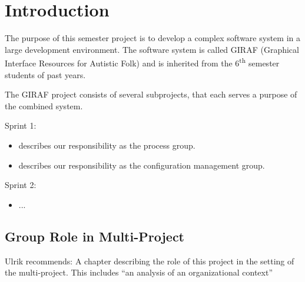 \chapter{Introduction}

The purpose of this semester project is to develop a complex software system in a large development environment. The software system is called GIRAF (Graphical Interface Resources for Autistic Folk) and is inherited from the 6\textsuperscript{th} semester students of past years.

The GIRAF project consists of several subprojects, that each serves a purpose of the combined system.
\\

\begin{documentorganization}
  \item Sprint 1:
  \begin{itemize}
    \item {} describes our responsibility as the process group.
    \item {} describes our responsibility as the configuration management group.
  \end{itemize}
  \item Sprint 2:
  \begin{itemize}
    \item ...
  \end{itemize}
\end{documentorganization}

\section{Group Role in Multi-Project}
Ulrik recommends: A chapter describing the role of this project in the setting of the multi-project. This includes ``an analysis of an organizational context''